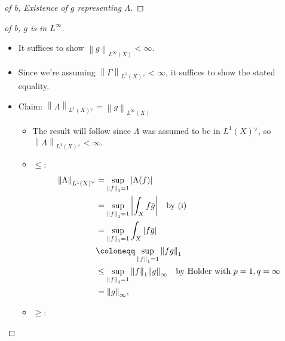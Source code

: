 \begin{solution}
\begin{proof}[of b, Existence of $g$ representing $\Lambda$]
\end{proof}

\begin{proof}[of b, $g$ is in $L^\infty$]

\envlist

\begin{itemize}
\item
  It suffices to show
  \({\left\lVert {g} \right\rVert}_{L^\infty(X)} < \infty\).
\item
  Since we're assuming
  \({\left\lVert {\Gamma} \right\rVert}_{L^1(X) {}^{ \vee }} < \infty\),
  it suffices to show the stated equality.
\item
  Claim:
  \({\left\lVert {\Lambda} \right\rVert}_{L^1(X) {}^{ \vee }} ={\left\lVert {g} \right\rVert}_{L^\infty(X)}\)

  \begin{itemize}
  \item
    The result will follow since \(\Lambda\) was assumed to be in
    \(L^1(X) {}^{ \vee }\), so
    \({\left\lVert {\Lambda} \right\rVert}_{L^1(X) {}^{ \vee }} < \infty\).
  \item
    \(\leq\):
    \begin{align*}
    {\left\lVert {\Lambda} \right\rVert}_{L^1(X) {}^{ \vee }} 
    &= \sup_{{\left\lVert {f} \right\rVert}_1 = 1} {\left\lvert {\Lambda(f)} \right\rvert} \\
    &= \sup_{{\left\lVert {f} \right\rVert}_1 = 1} {\left\lvert {\int_X f \mkern 1.5mu\overline{\mkern-1.5mug\mkern-1.5mu}\mkern 1.5mu} \right\rvert} \quad\text{by (i)}\\
    &= \sup_{{\left\lVert {f} \right\rVert}_1 = 1} \int_X {\left\lvert {f \mkern 1.5mu\overline{\mkern-1.5mug\mkern-1.5mu}\mkern 1.5mu} \right\rvert} \\
    &\coloneqq\sup_{{\left\lVert {f} \right\rVert}_1 = 1} {\left\lVert {fg} \right\rVert}_1 \\
    &\leq \sup_{{\left\lVert {f} \right\rVert}_1 = 1} {\left\lVert {f} \right\rVert}_1 {\left\lVert {g} \right\rVert}_\infty \quad\text{by Holder with } p=1,q=\infty\\
    &= {\left\lVert {g} \right\rVert}_\infty
    ,\end{align*}
  \item
    \(\geq\):


\end{itemize}
\end{itemize}
\end{proof}
\end{solution}

